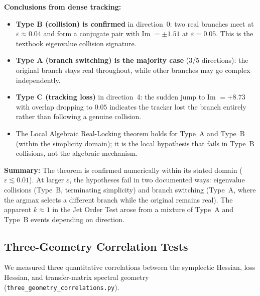 \documentclass[11pt]{amsart}
\begin{document}
\textbf{Conclusions from dense tracking:}
\begin{itemize}
\item \textbf{Type B (collision) is confirmed} in direction~0: two real
  branches meet at $\varepsilon \approx 0.04$ and form a conjugate pair
  with Im $= \pm 1.51$ at $\varepsilon = 0.05$.
  This is the textbook eigenvalue collision signature.
\item \textbf{Type A (branch switching) is the majority case} (3/5
  directions): the original branch stays real throughout, while other
  branches may go complex independently.
\item \textbf{Type C (tracking loss)} in direction~4: the sudden jump
  to Im $= +8.73$ with overlap dropping to $0.05$ indicates the tracker
  lost the branch entirely rather than following a genuine collision.
\item The Local Algebraic Real-Locking theorem holds for Type~A and
  Type~B (within the simplicity domain); it is the local hypothesis
  that fails in Type~B collisions, not the algebraic mechanism.
\end{itemize}

\textbf{Summary:} The theorem is confirmed numerically within its
stated domain ($\varepsilon \lesssim 0.01$).
At larger $\varepsilon$, the hypotheses fail in two documented ways:
eigenvalue collisions (Type~B, terminating simplicity) and
branch switching (Type~A, where the argmax selects a different branch
while the original remains real).
The apparent $k \approx 1$ in the Jet Order Test arose from a mixture
of Type~A and Type~B events depending on direction.

\subsection{Three-Geometry Correlation Tests}
\label{sec:three_geometry}

We measured three quantitative correlations between the symplectic
Hessian, loss Hessian, and transfer-matrix spectral geometry
(\texttt{three\_geometry\_correlations.py}).
\end{document}
